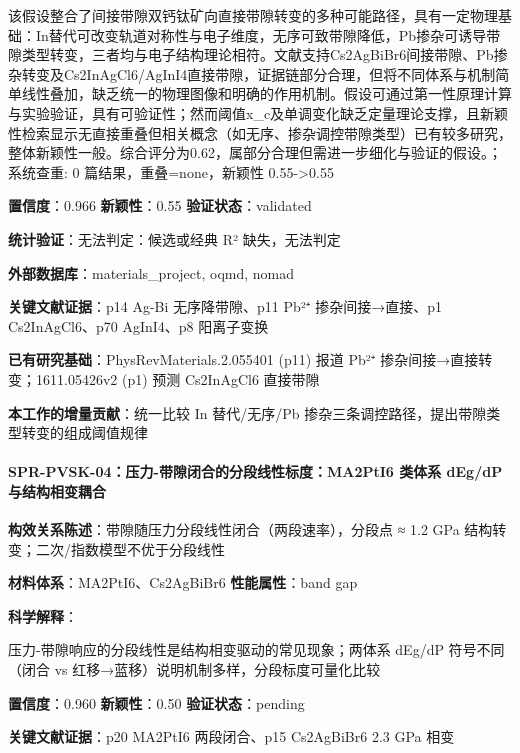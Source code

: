 \documentclass[12pt,a4paper]{ctexart}
\begin{document}
该假设整合了间接带隙双钙钛矿向直接带隙转变的多种可能路径，具有一定物理基础：In替代可改变轨道对称性与电子维度，无序可致带隙降低，Pb掺杂可诱导带隙类型转变，三者均与电子结构理论相符。文献支持Cs2AgBiBr6间接带隙、Pb掺杂转变及Cs2InAgCl6/AgInI4直接带隙，证据链部分合理，但将不同体系与机制简单线性叠加，缺乏统一的物理图像和明确的作用机制。假设可通过第一性原理计算与实验验证，具有可验证性；然而阈值x\_c及单调变化缺乏定量理论支撑，且新颖性检索显示无直接重叠但相关概念（如无序、掺杂调控带隙类型）已有较多研究，整体新颖性一般。综合评分为0.62，属部分合理但需进一步细化与验证的假设。；系统查重: 0 篇结果，重叠=none，新颖性 0.55-\textgreater0.55

\textbf{置信度}：0.966 \textbar{} \textbf{新颖性}：0.55 \textbar{} \textbf{验证状态}：validated

\textbf{统计验证}：无法判定：候选或经典 R² 缺失，无法判定

\textbf{外部数据库}：materials\_project, oqmd, nomad

\textbf{关键文献证据}：p14 Ag-Bi 无序降带隙、p11 Pb²⁺ 掺杂间接→直接、p1 Cs2InAgCl6、p70 AgInI4、p8 阳离子变换

\textbf{已有研究基础}：PhysRevMaterials.2.055401 (p11) 报道 Pb²⁺ 掺杂间接→直接转变；1611.05426v2 (p1) 预测 Cs2InAgCl6 直接带隙

\textbf{本工作的增量贡献}：统一比较 In 替代/无序/Pb 掺杂三条调控路径，提出带隙类型转变的组成阈值规律

\paragraph{SPR-PVSK-04：压力-带隙闭合的分段线性标度：MA2PtI6 类体系 dEg/dP 与结构相变耦合}\label{spr-pvsk-04ux538bux529b-ux5e26ux9699ux95edux5408ux7684ux5206ux6bb5ux7ebfux6027ux6807ux5ea6ma2pti6-ux7c7bux4f53ux7cfb-degdp-ux4e0eux7ed3ux6784ux76f8ux53d8ux8026ux5408}

\textbf{构效关系陈述}：带隙随压力分段线性闭合（两段速率），分段点 ≈ 1.2 GPa 结构转变；二次/指数模型不优于分段线性

\textbf{材料体系}：MA2PtI6、Cs2AgBiBr6 \textbar{} \textbf{性能属性}：band gap

\textbf{科学解释}：

压力-带隙响应的分段线性是结构相变驱动的常见现象；两体系 dEg/dP 符号不同（闭合 vs 红移→蓝移）说明机制多样，分段标度可量化比较

\textbf{置信度}：0.960 \textbar{} \textbf{新颖性}：0.50 \textbar{} \textbf{验证状态}：pending

\textbf{关键文献证据}：p20 MA2PtI6 两段闭合、p15 Cs2AgBiBr6 2.3 GPa 相变
\end{document}
